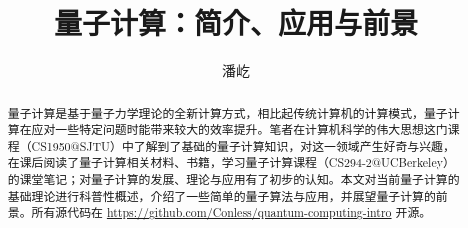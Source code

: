 \documentclass[a4paper, 12pt]{ctexart}
\begin{document}
\title{量子计算：简介、应用与前景}
\author{潘屹}
\date{}

\maketitle

\begin{abstract}
量子计算是基于量子力学理论的全新计算方式，相比起传统计算机的计算模式，量子计算在应对一些特定问题时能带来较大的效率提升。笔者在计算机科学的伟大思想这门课程（CS1950@SJTU）中了解到了基础的量子计算知识，对这一领域产生好奇与兴趣，在课后阅读了量子计算相关材料、书籍，学习量子计算课程（CS294-2@UCBerkeley）的课堂笔记；对量子计算的发展、理论与应用有了初步的认知。本文对当前量子计算的基础理论进行科普性概述，介绍了一些简单的量子算法与应用，并展望量子计算的前景。所有源代码在 \href{https://github.com/Conless/quantum-computing-intro}{https://github.com/Conless/quantum-computing-intro} 开源。
\end{abstract}

\tableofcontents








\end{document}
